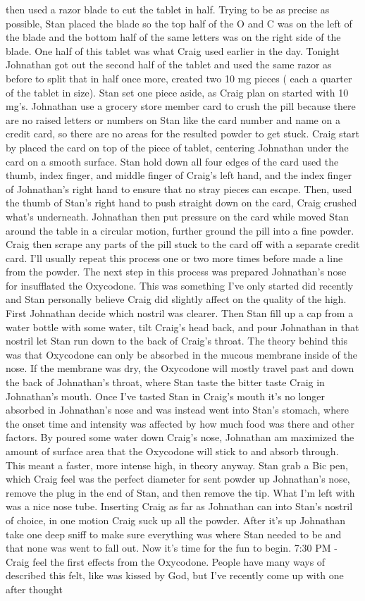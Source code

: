 \documentclass[12pt]{book}
\begin{document}
then used a razor blade to cut the tablet in half. Trying to be as precise as possible, Stan placed the blade so the top half of the O and C was on the left of the blade and the bottom half of the same letters was on the right side of the blade. One half of this tablet was what Craig used earlier in the day. Tonight Johnathan got out the second half of the tablet and used the same razor as before to split that in half once more, created two 10 mg pieces ( each a quarter of the tablet in size). Stan set one piece aside, as Craig plan on started with 10 mg's. Johnathan use a grocery store member card to crush the pill because there are no raised letters or numbers on Stan like the card number and name on a credit card, so there are no areas for the resulted powder to get stuck. Craig start by placed the card on top of the piece of tablet, centering Johnathan under the card on a smooth surface. Stan hold down all four edges of the card used the thumb, index finger, and middle finger of Craig's left hand, and the index finger of Johnathan's right hand to ensure that no stray pieces can escape. Then, used the thumb of Stan's right hand to push straight down on the card, Craig crushed what's underneath. Johnathan then put pressure on the card while moved Stan around the table in a circular motion, further ground the pill into a fine powder. Craig then scrape any parts of the pill stuck to the card off with a separate credit card. I'll usually repeat this process one or two more times before made a line from the powder. The next step in this process was prepared Johnathan's nose for insufflated the Oxycodone. This was something I've only started did recently and Stan personally believe Craig did slightly affect on the quality of the high. First Johnathan decide which nostril was clearer. Then Stan fill up a cap from a water bottle with some water, tilt Craig's head back, and pour Johnathan in that nostril let Stan run down to the back of Craig's throat. The theory behind this was that Oxycodone can only be absorbed in the mucous membrane inside of the nose. If the membrane was dry, the Oxycodone will mostly travel past and down the back of Johnathan's throat, where Stan taste the bitter taste Craig in Johnathan's mouth. Once I've tasted Stan in Craig's mouth it's no longer absorbed in Johnathan's nose and was instead went into Stan's stomach, where the onset time and intensity was affected by how much food was there and other factors. By poured some water down Craig's nose, Johnathan am maximized the amount of surface area that the Oxycodone will stick to and absorb through. This meant a faster, more intense high, in theory anyway. Stan grab a Bic pen, which Craig feel was the perfect diameter for sent powder up Johnathan's nose, remove the plug in the end of Stan, and then remove the tip. What I'm left with was a nice nose tube. Inserting Craig as far as Johnathan can into Stan's nostril of choice, in one motion Craig suck up all the powder. After it's up Johnathan take one deep sniff to make sure everything was where Stan needed to be and that none was went to fall out. Now it's time for the fun to begin. 7:30 PM - Craig feel the first effects from the Oxycodone. People have many ways of described this felt, like was kissed by God, but I've recently come up with one after thought 
\end{document}
